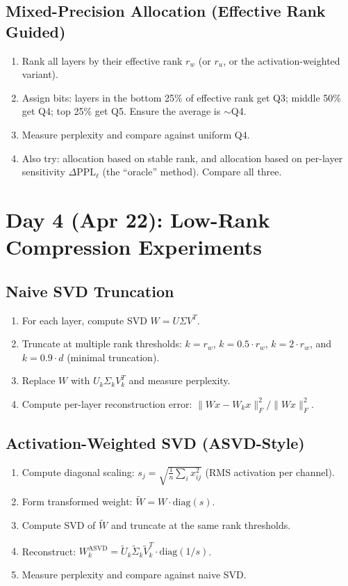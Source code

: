 \documentclass[11pt,a4paper]{article}
\begin{document}
\subsection{Mixed-Precision Allocation (Effective Rank Guided)}
\begin{enumerate}
    \item Rank all layers by their effective rank $r_w$ (or $r_u$, or the activation-weighted variant).
    \item Assign bits: layers in the bottom 25\% of effective rank get Q3; middle 50\% get Q4; top 25\% get Q5. Ensure the average is $\sim$Q4.
    \item Measure perplexity and compare against uniform Q4.
    \item Also try: allocation based on stable rank, and allocation based on per-layer sensitivity $\Delta \text{PPL}_\ell$ (the ``oracle'' method). Compare all three.
\end{enumerate}

\section{Day 4 (Apr 22): Low-Rank Compression Experiments}

\subsection{Naive SVD Truncation}
\begin{enumerate}
    \item For each layer, compute SVD $W = U\Sigma V^T$.
    \item Truncate at multiple rank thresholds: $k = r_w$, $k = 0.5 \cdot r_w$, $k = 2 \cdot r_w$, and $k = 0.9 \cdot d$ (minimal truncation).
    \item Replace $W$ with $U_k \Sigma_k V_k^T$ and measure perplexity.
    \item Compute per-layer reconstruction error: $\|Wx - W_k x\|_F^2 / \|Wx\|_F^2$.
\end{enumerate}

\subsection{Activation-Weighted SVD (ASVD-Style)}
\begin{enumerate}
    \item Compute diagonal scaling: $s_j = \sqrt{\frac{1}{n}\sum_i x_{ij}^2}$ (RMS activation per channel).
    \item Form transformed weight: $\tilde{W} = W \cdot \text{diag}(s)$.
    \item Compute SVD of $\tilde{W}$ and truncate at the same rank thresholds.
    \item Reconstruct: $W_k^{\text{ASVD}} = \tilde{U}_k \tilde{\Sigma}_k \tilde{V}_k^T \cdot \text{diag}(1/s)$.
    \item Measure perplexity and compare against naive SVD.
\end{enumerate}
\end{document}
